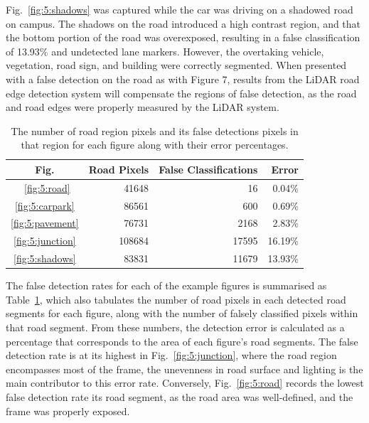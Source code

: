 Fig.~\ref{fig:5:shadows} was captured while the car was driving on a shadowed road on campus. The shadows on the road introduced a high contrast region, and that the bottom portion of the road was overexposed, resulting in a false classification of 13.93\% and undetected lane markers. However, the overtaking vehicle, vegetation, road sign, and building were correctly segmented. When presented with a false detection on the road as with Figure 7, results from the LiDAR road edge detection system will compensate the regions of false detection, as the road and road edges were properly measured by the LiDAR system. 

\begin{table}[H]
	\renewcommand{\arraystretch}{1.3}
	\caption[Semantic segmentation accuracy]{The number of road region pixels and its false detections pixels in that region for each figure along with their error percentages. }
	\label{tabpixelcount}
	\centering
	\begin{tabular}{crrr}
		\toprule
		        Fig.         & Road Pixels & False Classifications &   Error \\ \midrule
		 ~\ref{fig:5:road}   &       41648 &                    16 &  0.04\% \\
		\ref{fig:5:carpark}  &       86561 &                   600 &  0.69\% \\
		\ref{fig:5:pavement} &       76731 &                  2168 &  2.83\% \\
		\ref{fig:5:junction} &      108684 &                 17595 & 16.19\% \\
		\ref{fig:5:shadows}  &       83831 &                 11679 & 13.93\% \\ \bottomrule
	\end{tabular}
\end{table}

The false detection rates for each of the example figures is summarised as Table~\ref{tabpixelcount}, which also tabulates the number of road pixels in each detected road segments for each figure, along with the number of falsely classified pixels within that road segment. From these numbers, the detection error is calculated as a percentage that corresponds to the area of each figure's road segments. The false detection rate is at its highest in Fig.~\ref{fig:5:junction}, where the road region encompasses most of the frame, the unevenness in road surface and lighting is the main contributor to this error rate. Conversely, Fig.~\ref{fig:5:road} records the lowest false detection rate its road segment, as the road area was well-defined, and the frame was properly exposed. 

